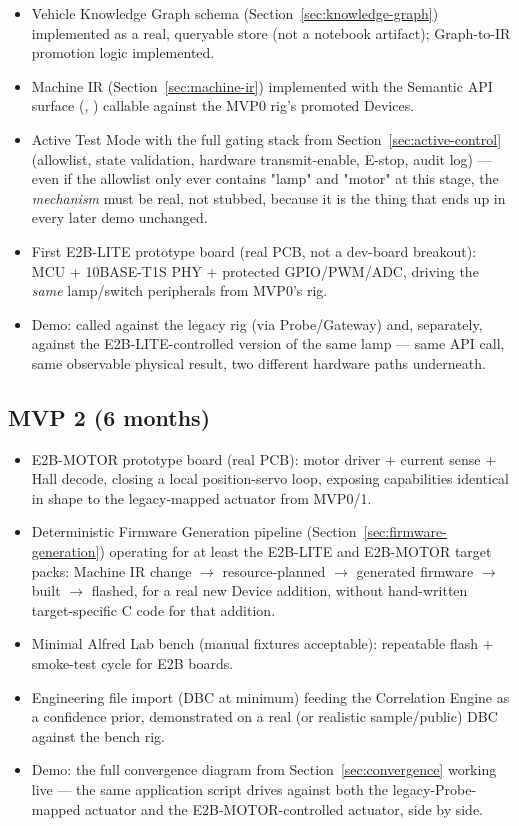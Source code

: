\begin{itemize}
\item Vehicle Knowledge Graph schema (Section~\ref{sec:knowledge-graph}) implemented as a real, queryable store (not a notebook artifact); Graph-to-IR promotion logic implemented.
\item Machine IR (Section~\ref{sec:machine-ir}) implemented with the Semantic API surface (, ) callable against the MVP0 rig's promoted Devices.
\item Active Test Mode with the full gating stack from Section~\ref{sec:active-control} (allowlist, state validation, hardware transmit-enable, E-stop, audit log) --- even if the allowlist only ever contains "lamp" and "motor" at this stage, the \emph{mechanism} must be real, not stubbed, because it is the thing that ends up in every later demo unchanged.
\item First E2B-LITE prototype board (real PCB, not a dev-board breakout): MCU + 10BASE-T1S PHY + protected GPIO/PWM/ADC, driving the \emph{same} lamp/switch peripherals from MVP0's rig.
\item Demo:  called against the legacy rig (via Probe/Gateway) and, separately, against the E2B-LITE-controlled version of the same lamp --- same API call, same observable physical result, two different hardware paths underneath.
\end{itemize}

\subsection{MVP 2 (6 months)}

\begin{itemize}
\item E2B-MOTOR prototype board (real PCB): motor driver + current sense + Hall decode, closing a local position-servo loop, exposing  capabilities identical in shape to the legacy-mapped actuator from MVP0/1.
\item Deterministic Firmware Generation pipeline (Section~\ref{sec:firmware-generation}) operating for at least the E2B-LITE and E2B-MOTOR target packs: Machine IR change $\rightarrow$ resource-planned $\rightarrow$ generated firmware $\rightarrow$ built $\rightarrow$ flashed, for a real new Device addition, without hand-written target-specific C code for that addition.
\item Minimal Alfred Lab bench (manual fixtures acceptable): repeatable flash + smoke-test cycle for E2B boards.
\item Engineering file import (DBC at minimum) feeding the Correlation Engine as a confidence prior, demonstrated on a real (or realistic sample/public) DBC against the bench rig.
\item Demo: the full convergence diagram from Section~\ref{sec:convergence} working live --- the same application script drives  against both the legacy-Probe-mapped actuator and the E2B-MOTOR-controlled actuator, side by side.
\end{itemize}

